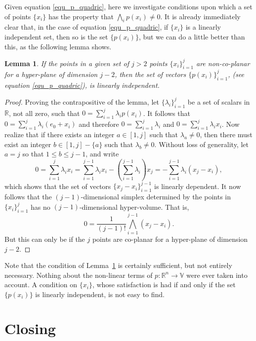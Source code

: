 \documentclass{birkjour}
\newtheorem{lem}[thm]{Lemma}
\theoremstyle{definition}
\theoremstyle{remark}
\numberwithin{equation}{section}
\newcommand{\R}{\mathbb{R}}
\newcommand{\V}{\mathbb{V}}
\begin{document}
Given equation \eqref{equ_p_quadric}, here we investigate conditions upon
which a set of points $\{x_i\}$ has the property that $\bigwedge_i p(x_i)\neq 0$.
It is already immediately clear that, in the case of equation \eqref{equ_p_quadric},
if $\{x_i\}$ is a linearly independent set, then so is the set $\{p(x_i)\}$, but we
can do a little better than this, as the following lemma shows.
\begin{lem}\label{lma_non_co_planar}
If the points in a given set of $j>2$ points $\{x_i\}_{i=1}^j$ are non-co-planar for a hyper-plane of
dimension $j-2$, then the set of vectors $\{p(x_i)\}_{i=1}^j$, (see equation \eqref{equ_p_quadric}),
is linearly independent.
\end{lem}
\begin{proof}
Proving the contrapositive of the lemma, let $\{\lambda_i\}_{i=1}^j$ be
a set of scalars in $\R$, not all zero, such that $0=\sum_{i=1}^j\lambda_i p(x_i)$.
It follows that $0=\sum_{i=1}^j\lambda_i(e_0+x_i)$ and therefore
$0=\sum_{i=1}^j\lambda_i$ and $0=\sum_{i=1}^j\lambda_i x_i$.
Now realize that if there exists an integer $a\in[1,j]$ such that $\lambda_a\neq 0$,
then there must exist an integer $b\in[1,j]-\{a\}$ such that $\lambda_b\neq 0$.
Without loss of generality, let $a=j$ so that $1\leq b\leq j-1$, and write
\begin{equation*}
0 = \sum_{i=1}^j\lambda_ix_i = \sum_{i=1}^{j-1}\lambda_ix_i - \left(\sum_{i=1}^{j-1}\lambda_i\right)x_j = -\sum_{i=1}^{j-1}\lambda_i(x_j-x_i),
\end{equation*}
which shows that the set of vectors $\{x_j-x_i\}_{i=1}^{j-1}$ is linearly dependent.
It now follows that the $(j-1)$-dimensional simplex determined by the points in $\{x_i\}_{i=1}^j$
has no $(j-1)$-dimensional hyper-volume.  That is,
\begin{equation*}
0 = \frac{1}{(j-1)!}\bigwedge_{i=1}^{j-1}(x_j-x_i).
\end{equation*}
But this can only be if the $j$ points are co-planar for a hyper-plane of dimension $j-2$.
\end{proof}
Note that the condition of Lemma~\ref{lma_non_co_planar} is certainly sufficient, but
not entirely necessary.  Nothing about the non-linear terms of $p:\R^n\to\V$ were ever
taken into account.  A condition on $\{x_i\}$, whose satisfaction is had if and only if the
set $\{p(x_i)\}$ is linearly independent, is not easy to find.

\section{Closing}
\end{document}
